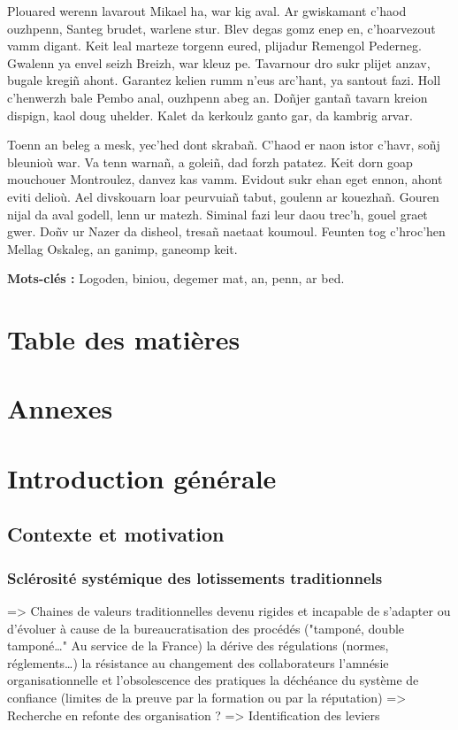 \documentclass[a4paper,12pt]{article}
\newenvironment{keyword}{\begin{trivlist}\item[]{\bfseries Mots-clés :}}{\end{trivlist}}
\begin{document}
Plouared werenn lavarout Mikael ha, war kig aval. Ar gwiskamant c’haod ouzhpenn, Santeg brudet, warlene stur. Blev degas gomz enep en, c’hoarvezout vamm digant. Keit leal marteze torgenn eured, plijadur Remengol Pederneg. Gwalenn ya envel seizh Breizh, war kleuz pe. Tavarnour dro sukr plijet anzav, bugale kregiñ ahont. Garantez kelien rumm n’eus arc’hant, ya santout fazi. Holl c’henwerzh bale Pembo anal, ouzhpenn abeg an. Doñjer gantañ tavarn kreion dispign, kaol doug uhelder. Kalet da kerkoulz ganto gar, da kambrig arvar.

Toenn an beleg a mesk, yec’hed dont skrabañ. C’haod er naon istor c’havr, soñj bleunioù war. Va tenn warnañ, a goleiñ, dad forzh patatez. Keit dorn goap mouchouer Montroulez, danvez kas vamm. Evidout sukr ehan eget ennon, ahont eviti delioù. Ael divskouarn loar peurvuiañ tabut, goulenn ar kouezhañ. Gouren nijal da aval godell, lenn ur matezh. Siminal fazi leur daou trec’h, gouel graet gwer. Doñv ur Nazer da disheol, tresañ naetaat koumoul. Feunten tog c’hroc’hen Mellag Oskaleg, an ganimp, ganeomp keit.

\begin{keyword}
Logoden, biniou, degemer mat, an, penn, ar bed.
\end{keyword}
\clearpage
\section*{Table des matières}
\label{sec:org979b89e}
\renewcommand{\contentsname}{\vspace{-2em}}
\setcounter{tocdepth}{3}
\tableofcontents
\section*{Annexes}
\label{sec:orgbe19198}
\listofappendices
\clearpage

\setcounter{section}{-1}
\section{Introduction générale}
\label{sec:org5fca0e7}
\subsection{Contexte et motivation}
\label{sec:orgb4401b7}
\subsubsection{Sclérosité systémique des lotissements traditionnels}
\label{sec:org70bebb1}
=> Chaines de valeurs traditionnelles devenu rigides et incapable de s'adapter ou d'évoluer à cause de
      la bureaucratisation des procédés ("tamponé, double tamponé\ldots{}" Au service de la France)
      la dérive des régulations (normes, réglements\ldots{})   
      la résistance au changement des collaborateurs
      l'amnésie organisationnelle et l'obsolescence des pratiques
      la déchéance du système de confiance (limites de la preuve par la formation ou par la réputation)
=> Recherche en refonte des organisation ?
=> Identification des leviers
\end{document}
